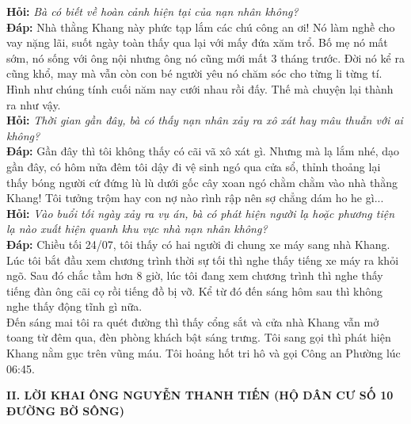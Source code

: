 \documentclass[12pt,a4paper]{article}
\begin{document}
\noindent\textbf{Hỏi:} \textit{Bà có biết về hoàn cảnh hiện tại của nạn nhân không?}\\[0.15cm]
\noindent\textbf{Đáp:} Nhà thằng Khang này phức tạp lắm các chú công an ơi! Nó làm nghề cho vay nặng lãi, suốt ngày toàn thấy qua lại với mấy đứa xăm trổ. Bố mẹ nó mất sớm, nó sống với ông nội nhưng ông nó cũng mới mất 3 tháng trước. Đời nó kể ra cũng khổ, may mà vẫn còn con bé người yêu nó chăm sóc cho từng li từng tí. Hình như chúng tính cuối năm nay cưới nhau rồi đấy. Thế mà chuyện lại thành ra như vậy.\\[0.35cm]

\noindent\textbf{Hỏi:} \textit{Thời gian gần đây, bà có thấy nạn nhân xảy ra xô xát hay mâu thuẫn với ai không?}\\[0.15cm]
\noindent\textbf{Đáp:} Gần đây thì tôi không thấy có cãi vã xô xát gì. Nhưng mà lạ lắm nhé, dạo gần đây, có hôm nửa đêm tôi dậy đi vệ sinh ngó qua cửa sổ, thỉnh thoảng lại thấy bóng người cứ đứng lù lù dưới gốc cây xoan ngó chằm chằm vào nhà thằng Khang! Tôi tưởng trộm hay con nợ nào rình rập nên sợ chẳng dám ho he gì...\\[0.35cm]

\noindent\textbf{Hỏi:} \textit{Vào buổi tối ngày xảy ra vụ án, bà có phát hiện người lạ hoặc phương tiện lạ nào xuất hiện quanh khu vực nhà nạn nhân không?}\\[0.15cm]
\noindent\textbf{Đáp:} Chiều tối 24/07, tôi thấy có hai người đi chung xe máy sang nhà Khang. Lúc tôi bắt đầu xem chương trình thời sự tối thì nghe thấy tiếng xe máy ra khỏi ngõ. Sau đó chắc tầm hơn 8 giờ, lúc tôi đang xem chương trình thì nghe thấy tiếng đàn ông cãi cọ rồi tiếng đồ bị vỡ. Kể từ đó đến sáng hôm sau thì không nghe thấy động tĩnh gì nữa.\\[0.35cm]
Đến sáng mai tôi ra quét đường thì thấy cổng sắt và cửa nhà Khang vẫn mở toang từ đêm qua, đèn phòng khách bật sáng trưng. Tôi sang gọi thì phát hiện Khang nằm gục trên vũng máu. Tôi hoảng hốt tri hô và gọi Công an Phường lúc 06:45.




\vspace{0.3cm}\noindent\textbf{\large II. LỜI KHAI ÔNG NGUYỄN THANH TIẾN (HỘ DÂN CƯ SỐ 10 ĐƯỜNG BỜ SÔNG)}\\[0.15cm]
\end{document}
